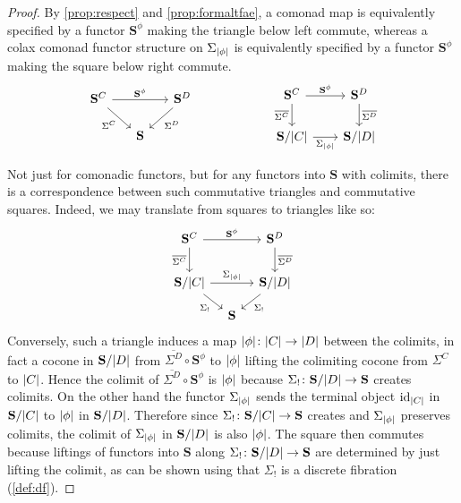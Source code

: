 \documentclass[11pt, oneside, article]{memoir}
\theoremstyle{plain}
\theoremstyle{definition}
\theoremstyle{remark}
\DeclareMathOperator{\id}{id}
\DeclarePairedDelimiter{\abs}{\lvert}{\rvert}
\newcommand{\bang}{\mathrm{!}}
\newcommand{\cat}[1]{\mathbf{#1}}
\newcommand{\CoalgOn}[2]{{#2}^{#1}}
\newcommand{\CoalgS}[1]{\CoalgOn{#1}{\bS}}
\newcommand{\pts}[1]{{\abs{#1}}}
\newcommand{\one}[1]{\pts{#1}}
\newcommand{\ptlift}[1]{\overline{#1}}
\newcommand{\carr}{\Sigma}
\newcommand{\leindex}[1]{\Sigma_{#1}}
\newcommand{\slicel}{\Sigma_\bang}
\newcommand{\car}[1]{\carr^{#1}}
\newcommand{\carC}{\car{\cC}}
\newcommand{\carD}{\car{\cD}}
\newcommand{\com}[2]{{#1}^{#2}}
\newcommand{\cmnd}[1]{{#1}}
\newcommand{\cC}{\cmnd{C}}
\newcommand{\cD}{\cmnd{D}}
\newcommand{\bS}{\cat{S}}
\newcommand{\CS}{\CoalgS{\cC}}
\newcommand{\DS}{\CoalgS{\cD}}
\newcommand{\SC}{\bS/\pts{\cC}}
\newcommand{\SD}{\bS/\pts{\cD}}
\begin{document}
\begin{proof}
  By \cref{prop:respect} and \cref{prop:formaltfae}, a comonad map is
  equivalently specified by a functor $\com{\bS}{\phi}$ making the
  triangle below left commute, whereas a colax comonad functor
  structure on $\leindex{\one{\phi}}$ is equivalently specified by a
  functor $\com{\bS}{\phi}$ making the square below right commute.
  \[
    \begin{tikzcd}[column sep=15pt, row sep=15pt]
      \CS\ar[rr, "\com{\bS}{\phi}"]\ar[dr, "\carC"']&&\DS\ar[dl, "\carD"]\\
      &\bS
    \end{tikzcd}
    \qquad\qquad\qquad
    \begin{tikzcd}[column sep=20]
      \CS & \DS \\
      {\SC} & {\SD}
      \arrow["{\com{\bS}{\phi}}", from=1-1, to=1-2]
      \arrow["{\ptlift{\carC}}"', from=1-1, to=2-1]
      \arrow["{\ptlift{\carD}}", from=1-2, to=2-2]
      \arrow["{\leindex{\one{\phi}}}"', from=2-1, to=2-2]
    \end{tikzcd}
  \]
  
  Not just for comonadic functors, but for any functors into $\bS$
  with colimits, there is a correspondence between such commutative
  triangles and commutative squares.  Indeed, we may translate from
  squares to triangles like so:
  \[\begin{tikzcd}[column sep=10pt, row sep=10pt]
      \CS && \DS \\
      \\
      \SC && \SD \\
      & \bS
      \arrow["{\com{\bS}{\phi}}", from=1-1, to=1-3]
      \arrow["{\ptlift{\carC}}"', from=1-1, to=3-1]
      \arrow["{\ptlift{\carD}}", from=1-3, to=3-3]
      \arrow["{\leindex{\one{\phi}}}", from=3-1, to=3-3]
      \arrow["\slicel"', from=3-1, to=4-2]
      \arrow["\slicel", from=3-3, to=4-2]
    \end{tikzcd}
  \]
  Conversely, such a triangle induces a map
  $\one{\phi} \colon \pts{\cC} \to \pts{\cD}$ between the colimits, in
  fact a cocone in $\SD$ from $\ptlift{\carD}\circ \com{\bS}{\phi}$ to
  $\one{\phi}$ lifting the colimiting cocone from $\carC$ to
  $\pts{\cC}$. Hence the colimit of
  $\ptlift{\carD}\circ \com{\bS}{\phi}$ is $\one{\phi}$ because
  $\slicel \colon \SD \to \bS$ creates colimits. On the other hand the
  functor $\leindex{\one{\phi}}$ sends the terminal object
  ${\id}_{\pts{\cC}}$ in $\SC$ to $\one{\phi}$ in $\SD$. Therefore
  since $\slicel \colon \SC \to \bS$ creates and
  $\leindex{\one{\phi}}$ preserves colimits, the colimit of
  $\leindex{\one{\phi}}$ in $\SD$ is also $\one{\phi}$. The square
  then commutes because liftings of functors into $\bS$ along
  $\slicel \colon \SD \to \bS$ are determined by just lifting the
  colimit, as can be shown using that $\slicel$ is a discrete fibration
  (\cref{def:df}).
\end{proof}
\end{document}
